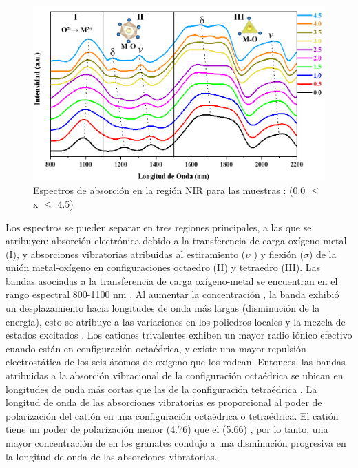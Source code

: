 \begin{figure}[h]
    \centering%

    \includegraphics[width=\textwidth]{Kap3/NIR.png}%
    \caption{Espectros de absorción en la región NIR para las muestras
    : (0.0 $\leq$ x $\leq$ 4.5)}
    \label{fig:nir}
\end{figure}

Los espectros se pueden separar en tres regiones principales, a las que se
atribuyen: absorción electrónica debido a la transferencia de carga
oxígeno-metal (I), y absorciones vibratorias atribuidas al estiramiento ($\upsilon$ ) y
flexión ($\sigma$) de la unión metal-oxígeno en configuraciones octaedro (II) y
tetraedro (III). Las bandas asociadas a la transferencia de carga oxígeno-metal
se encuentran en el rango espectral 800-1100 nm \cite{Rossman2019}. Al aumentar la concentración
, la banda exhibió un desplazamiento hacia longitudes de onda más largas
(disminución de la energía), esto se atribuye a las variaciones en los
poliedros locales y la mezcla de estados excitados \cite{Krambrock2013}. Los cationes trivalentes
exhiben un mayor radio iónico efectivo cuando
están en configuración octaédrica, y existe una mayor repulsión electrostática
de los seis átomos de oxígeno que los rodean. Entonces, las bandas atribuidas a
la absorción vibracional de la configuración octaédrica se ubican en longitudes
de onda más cortas que las de la configuración tetraédrica \cite{Rossman2019}. La longitud de
onda de las absorciones vibratorias es proporcional al poder de polarización
del catión en una configuración octaédrica o tetraédrica. El catión  tiene
un poder de polarización menor (4.76) que el  (5.66) \cite{Bishop2019}, por lo tanto, una
mayor concentración de  en los granates condujo a una disminución
progresiva en la longitud de onda de las absorciones vibratorias.